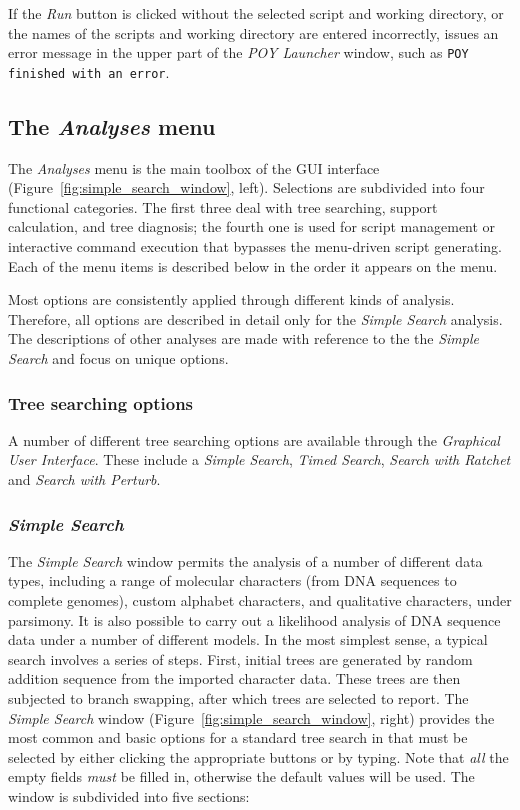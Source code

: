 If the \emph{Run} button is clicked without the selected script and
working directory, or the names of the scripts and working directory are entered incorrectly, \poy issues an
error message in the upper part of the \emph{POY Launcher} window,
such as \texttt{POY finished with an error}.

\subsection{The \emph{Analyses} menu}
The \emph{Analyses} menu is the main toolbox of the \poy GUI interface (Figure~\ref{fig:simple_search_window}, left). 
Selections are subdivided into four functional categories. The first three deal with tree searching, support calculation, 
and tree diagnosis; the fourth one is used for  script management or interactive command execution that bypasses the 
menu-driven script generating. Each of the menu items is described below in the order it appears on the menu.

Most options are consistently applied through different kinds of analysis. Therefore, all options are described in detail 
only for the \emph{Simple Search} analysis. The descriptions of other analyses are made with reference to the the 
\emph{Simple Search} and focus on unique options.


\subsubsection{Tree searching options}

A number of different tree searching options are available through the \emph{Graphical User Interface}.  
These include a \emph{Simple Search}, \emph{Timed Search}, \emph{Search with Ratchet} and 
\emph{Search with Perturb}. 

\subsubsection*{\emph{Simple Search}}
The \emph{Simple Search} window permits the analysis of a number of different data types, 
including a range of molecular characters (from DNA sequences to complete genomes), custom alphabet 
characters, and qualitative characters, under parsimony.  It is also possible to carry out a likelihood 
analysis of DNA sequence data under a number of different models.  In the most simplest sense, a 
typical search involves a series of steps. First, initial trees are generated by random addition sequence 
from the imported character data. These trees are then subjected to branch swapping, after which trees 
are selected to report. The \emph{Simple Search} window (Figure~\ref{fig:simple_search_window}, right) 
provides the most common and basic options for a standard tree search in \poy that must be selected 
by either clicking the appropriate buttons or by typing. Note that \emph{all} the empty fields \emph{must} 
be filled in, otherwise the default values will be used. The window is subdivided into five sections: 

